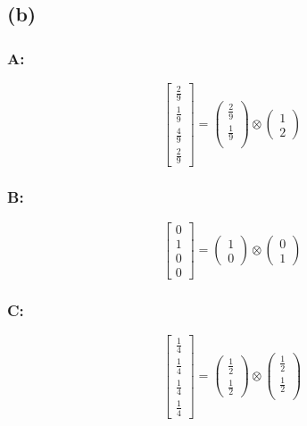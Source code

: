\documentclass[]{article}
\begin{document}
\hypertarget{b-1}{%
\subsection{(b)}\label{b-1}}

\hypertarget{a-2}{%
\subsubsection{A:}\label{a-2}}

\[
\begin{bmatrix}
\frac{2}{9 } \\
\frac{1}{9} \\
\frac{4}{9} \\
\frac{2}{9}
\end{bmatrix}=\begin{pmatrix}
\frac{2}{9} \\
\frac{1}{9} \\
\end{pmatrix}\otimes \begin{pmatrix}
1 \\
2
\end{pmatrix}
\]

\hypertarget{b-2}{%
\subsubsection{B:}\label{b-2}}

\[
\begin{bmatrix}
0 \\
1 \\
0 \\
0
\end{bmatrix}=\begin{pmatrix}
1 \\
0
\end{pmatrix}\otimes \begin{pmatrix}
0 \\
1
\end{pmatrix}
\]

\hypertarget{c-1}{%
\subsubsection{C:}\label{c-1}}

\[
\begin{bmatrix}
\frac{1}{4} \\
\frac{1}{4} \\
\frac{1}{4} \\
\frac{1}{4}
\end{bmatrix}=\begin{pmatrix}
\frac{1}{2} \\
\frac{1}{2}
\end{pmatrix}\otimes \begin{pmatrix}
\frac{1}{2} \\
\frac{1}{2} \\
\end{pmatrix}
\]
\end{document}
